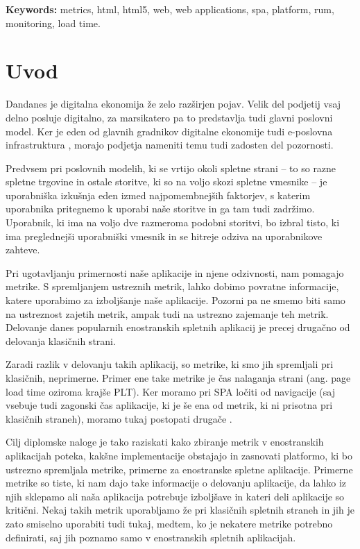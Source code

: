 \documentclass[a4paper, 12pt]{book}
\newcommand{\tkeywordsEn}{metrics, html, html5, web, web applications, spa, platform, rum, monitoring, load time}
\newcommand{\clearemptydoublepage}{\newpage{\pagestyle{empty}\cleardoublepage}}
\begin{document}
\bigskip

\noindent\textbf{Keywords:} \tkeywordsEn.
\clearemptydoublepage

\mainmatter
\setcounter{page}{1}
\pagestyle{fancy}

\chapter{Uvod}

Dandanes je digitalna ekonomija že zelo razširjen pojav. Velik del podjetij vsaj delno posluje digitalno, za marsikatero pa to predstavlja tudi glavni poslovni model. Ker je eden od glavnih gradnikov digitalne ekonomije tudi e-poslovna infrastruktura \cite{digital_econ}, morajo podjetja nameniti temu tudi zadosten del pozornosti.

Predvsem pri poslovnih modelih, ki se vrtijo okoli spletne strani – to so razne spletne trgovine in ostale storitve, ki so na voljo skozi spletne vmesnike – je uporabniška izkušnja eden izmed najpomembnejših faktorjev, s katerim uporabnika pritegnemo k uporabi naše storitve in ga tam tudi zadržimo. Uporabnik, ki ima na voljo dve razmeroma podobni storitvi, bo izbral tisto, ki ima preglednejši uporabniški vmesnik in se hitreje odziva na uporabnikove zahteve. 

Pri ugotavljanju primernosti naše aplikacije in njene odzivnosti, nam pomagajo metrike. S spremljanjem ustreznih metrik, lahko dobimo povratne informacije, katere uporabimo za izboljšanje naše aplikacije. Pozorni pa ne smemo biti samo na ustreznost zajetih metrik, ampak tudi na ustrezno zajemanje teh metrik. Delovanje danes popularnih enostranskih spletnih aplikacij je precej drugačno od delovanja klasičnih strani.

Zaradi razlik v delovanju takih aplikacij, so metrike, ki smo jih spremljali pri klasičnih, neprimerne. Primer ene take metrike je čas nalaganja strani (ang. page load time oziroma krajše PLT). Ker moramo pri SPA ločiti  od  navigacije (saj  vsebuje tudi zagonski čas aplikacije, ki je še ena od metrik, ki ni prisotna pri klasičnih straneh), moramo tukaj postopati drugače \cite{hard_vs_soft_navigation} \cite{spa_presentation}.

Cilj diplomske naloge je tako raziskati kako zbiranje metrik v enostranskih aplikacijah poteka, kakšne implementacije obstajajo in zasnovati platformo, ki bo ustrezno spremljala metrike, primerne za enostranske spletne aplikacije. Primerne metrike so tiste, ki nam dajo take informacije o delovanju aplikacije, da lahko iz njih sklepamo ali naša aplikacija potrebuje izboljšave in kateri deli aplikacije so kritični. Nekaj takih metrik uporabljamo že pri klasičnih spletnih straneh in jih je zato smiselno uporabiti tudi tukaj, medtem, ko je nekatere metrike potrebno definirati, saj jih poznamo samo v enostranskih spletnih aplikacijah.
\end{document}
